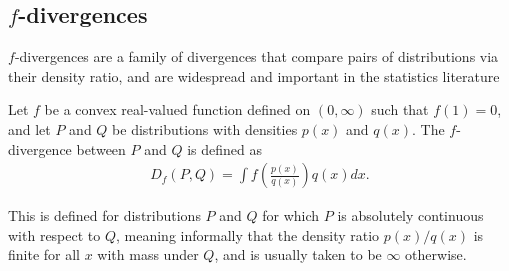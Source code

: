 \subsection{$f$-divergences}\label{subsec:f-divergences-intro}



$f$-divergences are a family of divergences that compare pairs of distributions via their density ratio, and are widespread and important in the statistics literature \citep{csiszar2004information, liese2006divergences, tsybakov2009}

\medskip

\begin{definition}
Let $f$ be a convex real-valued function defined on $(0, \infty)$ such that $f(1)=0$, and let $P$ and $Q$ be distributions with densities $p(x)$ and $q(x)$.
The $f$-divergence between $P$ and $Q$ is defined as
%
\begin{align*}
D_f(P, Q) = \int f\left(\frac{p(x)}{q(x)}\right) q(x) dx.
\end{align*}
%
\end{definition}
This is defined for distributions $P$ and $Q$ for which $P$ is absolutely continuous with respect to $Q$, meaning informally that the density ratio $p(x)/q(x)$ is finite for all $x$ with mass under $Q$, and is usually taken to be $\infty$ otherwise.

